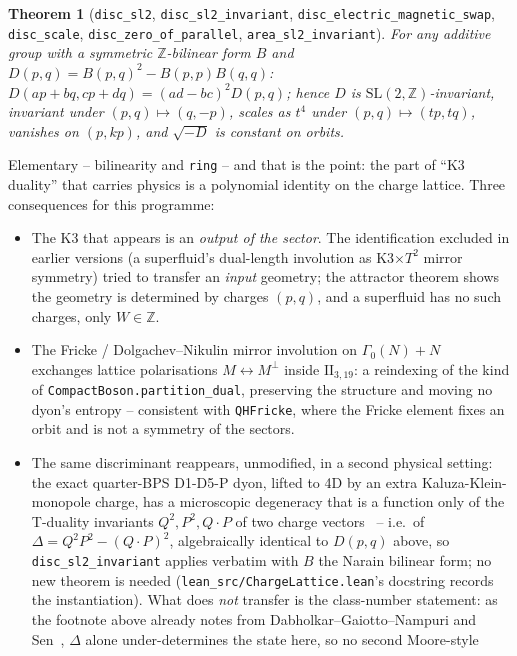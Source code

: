 \documentclass[11pt,a4paper]{article}
\newcommand{\lean}[1]{\texttt{\small #1}}
\newtheorem{theorem}{Theorem}
\begin{document}
\begin{theorem}[\lean{disc\_sl2}, \lean{disc\_sl2\_invariant}, \lean{disc\_electric\_magnetic\_swap},
\lean{disc\_scale}, \lean{disc\_zero\_of\_parallel}, \lean{area\_sl2\_invariant}]
For any additive group with a symmetric $\mathbb Z$-bilinear form $B$ and $D(p,q)=B(p,q)^2-B(p,p)B(q,q)$:
$D(ap+bq,cp+dq)=(ad-bc)^2D(p,q)$; hence $D$ is $\mathrm{SL}(2,\mathbb Z)$-invariant, invariant under
$(p,q)\mapsto(q,-p)$, scales as $t^4$ under $(p,q)\mapsto(tp,tq)$, vanishes on $(p,kp)$, and
$\sqrt{-D}$ is constant on orbits.
\end{theorem}
Elementary -- bilinearity and \lean{ring} -- and that is the point: the part of ``K3 duality'' that carries
physics is a polynomial identity on the charge lattice. Three consequences for this programme:
\begin{itemize}[leftmargin=*]
\item The K3 that appears is an \emph{output of the sector}. The identification excluded in earlier
  versions (a superfluid's dual-length involution as K3$\times T^2$ mirror symmetry) tried to transfer an
  \emph{input} geometry; the attractor theorem shows the geometry is determined by charges $(p,q)$, and a
  superfluid has no such charges, only $W\in\mathbb Z$.
\item The Fricke / Dolgachev--Nikulin mirror involution on $\Gamma_0(N)+N$~\cite{Dolgachev1996} exchanges
  lattice polarisations $M\leftrightarrow M^\perp$ inside $\mathrm{II}_{3,19}$: a reindexing of the kind of
  \lean{CompactBoson.partition\_dual}, preserving the structure and moving no dyon's entropy -- consistent with
  \lean{QHFricke}, where the Fricke element fixes an orbit and is not a symmetry of the sectors.
\item The same discriminant reappears, unmodified, in a second physical setting: the exact quarter-BPS
  D1-D5-P dyon, lifted to 4D by an extra Kaluza-Klein-monopole charge, has a microscopic degeneracy that is a
  function only of the T-duality invariants $Q^2,P^2,Q\cdot P$ of two charge vectors~\cite{Sen2008review} -- i.e.\
  of $\Delta=Q^2P^2-(Q\cdot P)^2$, algebraically identical to $D(p,q)$ above, so \lean{disc\_sl2\_invariant}
  applies verbatim with $B$ the Narain bilinear form; no new theorem is needed
  (\lean{lean\_src/ChargeLattice.lean}'s docstring records the instantiation). What does \emph{not} transfer is
  the class-number statement: as the footnote above already notes from Dabholkar--Gaiotto--Nampuri and
  Sen~\cite{Sen2007dyon}, $\Delta$ alone under-determines the state here, so no second Moore-style

\end{itemize}
\end{document}
